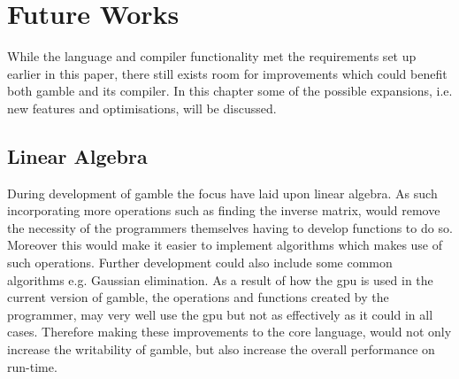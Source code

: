 \chapter{Future Works}\label{cha:future_works}
While the language and compiler functionality met the requirements set up earlier in this paper, there still exists room for improvements which could benefit both \gls{gamble} and its compiler.
In this chapter some of the possible expansions, i.e. new features and optimisations, will be discussed.

\section{Linear Algebra}\label{improve:LIAL}
During development of \gls{gamble} the focus have laid upon linear algebra.
As such incorporating more operations such as finding the inverse matrix, would remove the necessity of the programmers themselves having to develop functions to do so.
Moreover this would make it easier to implement algorithms which makes use of such operations.
Further development could also include some common algorithms e.g. Gaussian elimination.
As a result of how the \acrshort{gpu} is used in the current version of \gls{gamble}, the operations and functions created by the programmer, may very well use the \acrshort{gpu} but not as effectively as it could in all cases.
Therefore making these improvements to the core language, would not only increase the writability of \gls{gamble}, but also increase the overall performance on run-time.

